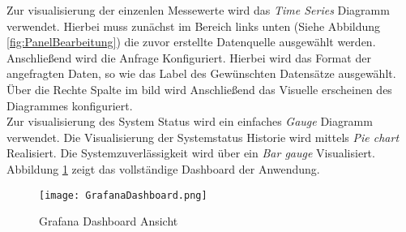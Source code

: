 \vspace{-1.8cm}
Zur visualisierung der einzenlen Messewerte wird das \textit{Time Series} Diagramm verwendet. Hierbei muss zunächst im Bereich links unten (Siehe Abbildung \ref{fig:PanelBearbeitung}) die zuvor erstellte Datenquelle ausgewählt werden. Anschließend wird die Anfrage Konfiguriert. Hierbei wird das Format der angefragten Daten, so wie das Label des Gewünschten Datensätze ausgewählt. Über die Rechte Spalte im bild wird Anschließend das Visuelle erscheinen des Diagrammes konfiguriert.\\
Zur visualisierung des System Status wird ein einfaches \textit{Gauge} Diagramm verwendet. Die Visualisierung der Systemstatus Historie wird mittels \textit{Pie chart} Realisiert. Die Systemzuverlässigkeit wird über ein \textit{Bar gauge} Visualisiert.\\
Abbildung \ref{fig:Grafa} zeigt das vollständige Dashboard der Anwendung.
\vspace{-2cm}
\begin{center}
    \begin{figure}[h!]
        \centering
        \texttt{[image: GrafanaDashboard.png]}
        \caption{Grafana Dashboard Ansicht}
        \label{fig:Grafa}
    \end{figure}
\end{center}